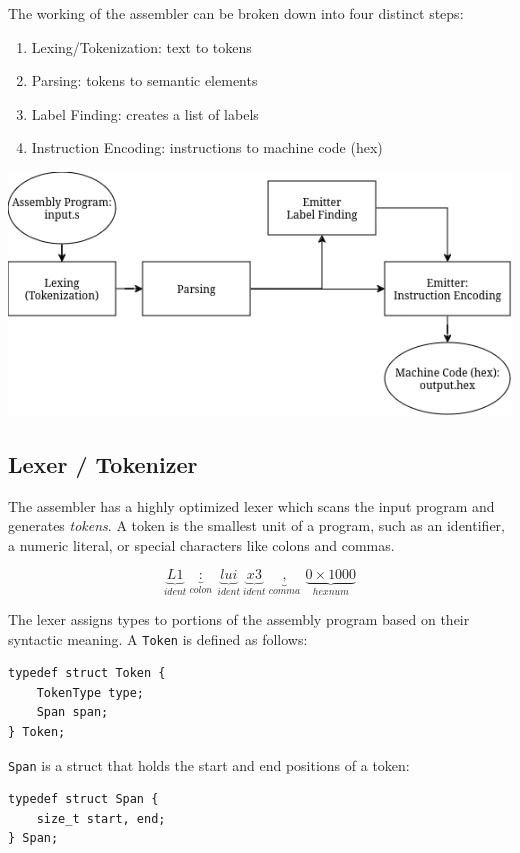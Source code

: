\documentclass{article}
\begin{document}
The working of the assembler can be broken down into four
distinct steps:

\begin{enumerate}
    \item Lexing/Tokenization: text to tokens
    \item Parsing: tokens to semantic elements
    \item Label Finding: creates a list of labels
    \item Instruction Encoding: instructions to machine code (hex)
\end{enumerate}

\vspace{1cm}

\includegraphics[width=0.8\linewidth]{Flowchart.png}

\subsection{Lexer / Tokenizer}

The assembler has a highly optimized lexer which scans the input 
program and generates {\em tokens}. A token is the smallest unit
of a program, such as an identifier, a numeric literal, or 
special characters like colons and commas.

$$
\underbrace{L1}_{ident}\ \underbrace{:}_{colon}\ \underbrace{lui}_{ident}\ \underbrace{x3}_{ident}\ \underbrace{,}_{comma}\ \underbrace{0{\times}1000}_{hexnum}
$$

The lexer assigns types to portions of the assembly program based
on their syntactic meaning. A \texttt{Token} is defined as follows:

\begin{verbatim}
typedef struct Token {
    TokenType type;
    Span span;	
} Token;
\end{verbatim}

\texttt{Span} is a struct that holds the start and end positions of a token:

\begin{verbatim}
typedef struct Span {
    size_t start, end;
} Span;
\end{verbatim}
\end{document}
